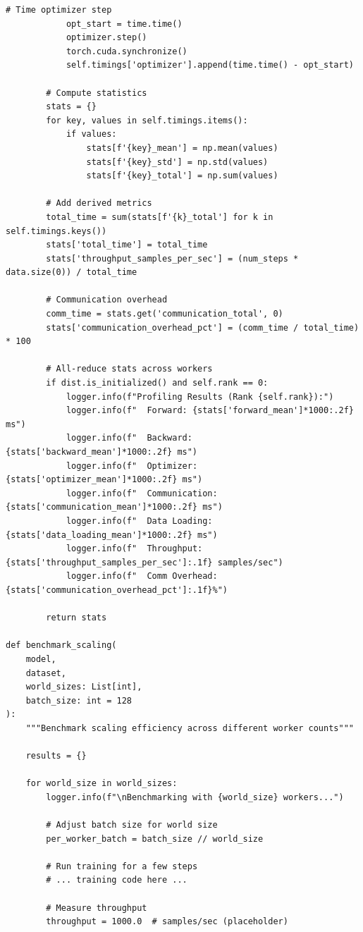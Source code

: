 \begin{lstlisting}[style=python, caption=Distributed Training Performance Profiler]
            # Time optimizer step
            opt_start = time.time()
            optimizer.step()
            torch.cuda.synchronize()
            self.timings['optimizer'].append(time.time() - opt_start)

        # Compute statistics
        stats = {}
        for key, values in self.timings.items():
            if values:
                stats[f'{key}_mean'] = np.mean(values)
                stats[f'{key}_std'] = np.std(values)
                stats[f'{key}_total'] = np.sum(values)

        # Add derived metrics
        total_time = sum(stats[f'{k}_total'] for k in self.timings.keys())
        stats['total_time'] = total_time
        stats['throughput_samples_per_sec'] = (num_steps * data.size(0)) / total_time

        # Communication overhead
        comm_time = stats.get('communication_total', 0)
        stats['communication_overhead_pct'] = (comm_time / total_time) * 100

        # All-reduce stats across workers
        if dist.is_initialized() and self.rank == 0:
            logger.info(f"Profiling Results (Rank {self.rank}):")
            logger.info(f"  Forward: {stats['forward_mean']*1000:.2f} ms")
            logger.info(f"  Backward: {stats['backward_mean']*1000:.2f} ms")
            logger.info(f"  Optimizer: {stats['optimizer_mean']*1000:.2f} ms")
            logger.info(f"  Communication: {stats['communication_mean']*1000:.2f} ms")
            logger.info(f"  Data Loading: {stats['data_loading_mean']*1000:.2f} ms")
            logger.info(f"  Throughput: {stats['throughput_samples_per_sec']:.1f} samples/sec")
            logger.info(f"  Comm Overhead: {stats['communication_overhead_pct']:.1f}%")

        return stats

def benchmark_scaling(
    model,
    dataset,
    world_sizes: List[int],
    batch_size: int = 128
):
    """Benchmark scaling efficiency across different worker counts"""

    results = {}

    for world_size in world_sizes:
        logger.info(f"\nBenchmarking with {world_size} workers...")

        # Adjust batch size for world size
        per_worker_batch = batch_size // world_size

        # Run training for a few steps
        # ... training code here ...

        # Measure throughput
        throughput = 1000.0  # samples/sec (placeholder)


\end{lstlisting}
